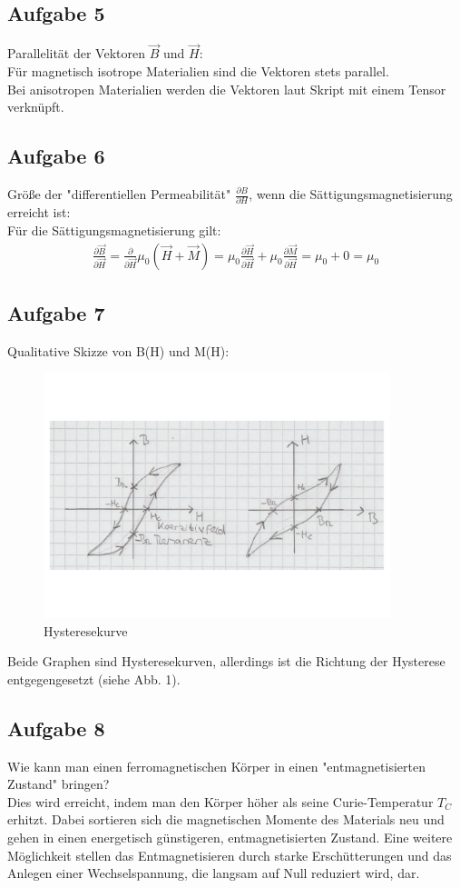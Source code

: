 \documentclass[a4paper,10pt]{scrartcl}
\begin{document}
\subsection{Aufgabe 5}
Parallelität der Vektoren $\vec{B}$ und $\vec{H}$: \\
Für magnetisch isotrope Materialien sind die Vektoren stets parallel. \\
Bei anisotropen Materialien werden die Vektoren laut Skript mit einem Tensor verknüpft.
\subsection{Aufgabe 6}
Größe der "differentiellen Permeabilität" $\frac{\partial B}{\partial H}$, wenn die Sättigungsmagnetisierung erreicht ist: \\
Für die Sättigungsmagnetisierung gilt: \\
\begin{align*}
\frac{\partial \vec{B}}{\partial \vec{H}} = \frac{\partial}{\partial \vec{H}} \mu_0 (\vec{H} + \vec{M}) = \mu_0 \frac{\partial \vec{H}}{\partial \vec{H}}+ \mu_{0} \frac{\partial \vec{M}}{\partial \vec{H}} = \mu_0 + 0 = \mu_0 
\end{align*}
\subsection{Aufgabe 7}
Qualitative Skizze von B(H) und M(H): 
\begin{figure}[h]
\centering
\includegraphics[width=0.9\textwidth]{./Bilder/fmhysterese}
\caption{Hysteresekurve}
\end{figure}
\FloatBarrier
Beide Graphen sind Hysteresekurven, allerdings ist die Richtung der Hysterese entgegengesetzt (siehe Abb. 1).
\subsection{Aufgabe 8}
Wie kann man einen ferromagnetischen Körper in einen "entmagnetisierten Zustand" bringen? \\
Dies wird erreicht, indem man den Körper höher als seine Curie-Temperatur $T_C$ erhitzt. Dabei sortieren sich die magnetischen Momente des Materials neu und gehen in einen energetisch günstigeren, entmagnetisierten Zustand. Eine weitere Möglichkeit stellen das Entmagnetisieren durch starke Erschütterungen und das Anlegen einer Wechselspannung, die langsam auf Null reduziert wird, dar.
\end{document}
